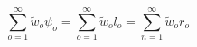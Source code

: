 \begin{equation}
\sum_{o=1}^{\infty }{\tilde{w}}_{o}\psi _{o}=\sum_{o=1}^{\infty }{\tilde{w}}%
_{o}l_{o}=\sum_{n=1}^{\infty }{\tilde{w}}_{o}r_{o}  \label{CONTI}
\end{equation}

